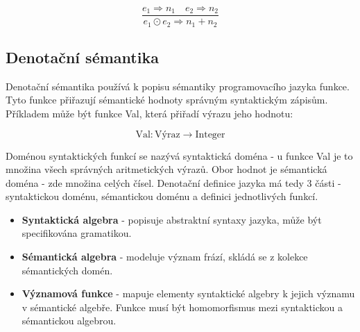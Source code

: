 $$\frac{e_1 \Longrightarrow n_1 \quad e_2 \Longrightarrow n_2}{e_1 \odot e_2 \Longrightarrow n_1 + n_2}$$





\subsection{Denotační sémantika}

Denotační sémantika používá k popisu sémantiky programovacího jazyka funkce. Tyto funkce přiřazují sémantické hodnoty správným syntaktickým zápisům. Příkladem může být funkce Val, která přiřadí výrazu jeho hodnotu:

$$\text{Val}: \text{Výraz} \rightarrow \text{Integer}$$

Doménou syntaktických funkcí se nazývá syntaktická doména - u funkce Val je to množina všech správných aritmetických výrazů. Obor hodnot je sémantická doména - zde množina celých čísel. Denotační definice jazyka má tedy 3 části - syntaktickou doménu, sémantickou doménu a definici jednotlivých funkcí.

\begin{itemize}[itemsep=0px]
\item \textbf{Syntaktická algebra} - popisuje abstraktní syntaxy jazyka, může být specifikována gramatikou.
\item \textbf{Sémantická algebra} - modeluje význam frází, skládá se z kolekce sémantických domén.
\item \textbf{Významová funkce} - mapuje elementy syntaktické algebry k jejich významu v sémantické algebře. Funkce musí být homomorfismus mezi syntaktickou a sémantickou algebrou.
\end{itemize}

